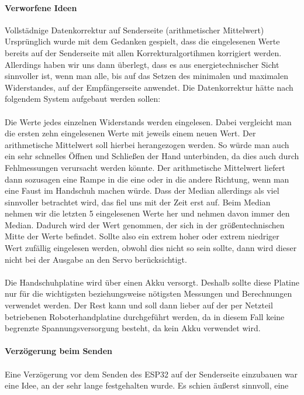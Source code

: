 \documentclass[titlepage,12pt,twoside]{article}
\begin{document}
\paragraph{Verworfene Ideen}
\hfill \break
\hfill \break
Vollstädnige Datenkorrektur auf Senderseite (arithmetischer Mittelwert) \\
Ursprünglich wurde mit dem Gedanken gespielt, dass die eingelesenen Werte bereits auf der Senderseite mit allen Korrekturalgortihmen korrigiert werden. 
Allerdings haben wir uns dann überlegt, dass es aus energietechnischer Sicht sinnvoller ist, wenn man alle, bis auf das Setzen des minimalen und maximalen Widerstandes, auf der Empfängerseite 
anwendet. Die Datenkorrektur hätte nach folgendem System aufgebaut werden sollen: \\
\\
Die Werte jedes einzelnen Widerstands werden eingelesen. Dabei vergleicht man die ersten zehn eingelesenen Werte mit jeweils 
einem neuen Wert. Der arithmetische Mittelwert soll hierbei herangezogen werden. So würde man auch ein sehr schnelles Öffnen 
und Schließen der Hand unterbinden, da dies auch durch Fehlmessungen verursacht werden könnte. Der arithmetische Mittelwert 
liefert dann sozusagen eine Rampe in die eine oder in die andere Richtung, wenn man eine Faust im Handschuh machen würde. Dass 
der Median allerdings als viel sinnvoller betrachtet wird, das fiel uns mit der Zeit erst auf. Beim Median nehmen wir die 
letzten 5 eingelesenen Werte her und nehmen davon immer den Median. Dadurch wird der Wert genommen, der sich in der 
größentechnischen Mitte der Werte befindet. Sollte also ein extrem hoher oder extrem niedriger Wert zufällig eingelesen werden, 
obwohl dies nicht so sein sollte, dann wird dieser nicht bei der Ausgabe an den Servo berücksichtigt. \\
\\
Die Handschuhplatine wird über einen Akku versorgt. Deshalb sollte diese Platine nur für die wichtigsten beziehungsweise 
nötigsten Messungen und Berechnungen verwendet werden. Der Rest kann und soll dann lieber auf der per Netzteil betriebenen 
Roboterhandplatine durchgeführt werden, da in diesem Fall keine begrenzte Spannungsversorgung besteht, da kein Akku verwendet 
wird. \\
\\
\textbf{Verzögerung beim Senden} \\
\\
Eine Verzögerung vor dem Senden des ESP32 auf der Senderseite einzubauen war eine 
Idee, an der sehr lange festgehalten wurde. Es schien äußerst sinnvoll, eine 
\end{document}

